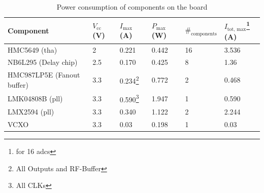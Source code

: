 \begin{table}[tbh]
	\caption{Power consumption of components on the board}
	\label{tab:----theresacomp}
	\begin{minipage}{\textwidth}
		\centering
		\begin{tabularx}{\textwidth}{Xlllll}
			\toprule
			\textbf{Component}         & $V_\text{cc}$ (V) & $I_\text{max}$ (A)                        & $P_\text{max}$ (W) & $\#_\text{components}$ & $I_\text{tot, max}$\footnote{for 16 \glspl{adc}} (A) \\ \midrule
			HMC5649 (\gls{tha})        & 2                 & 0.221                                     & 0.442              & 16                & 3.536                                                \\
			NB6L295 (Delay chip)       & 2.5               & 0.170                                     & 0.425              & 8                 & 1.36                                                 \\
			HMC987LP5E (Fanout buffer) & 3.3               & 0.234\footnote{All Outputs and RF-Buffer} & 0.772              & 2                 & 0.468                                                \\
			LMK04808B (\gls{pll})      & 3.3               & 0.590\footnote{All CLKs}                  & 1.947              & 1                 & 0.590                                                \\
			LMX2594 (\gls{pll})        & 3.3               & 0.340                                     & 1.122              & 2                 & 2.244                                                \\
			VCXO                       & 3.3               & 0.03                                      & 0.198              & 1                 & 0.03                                                 \\ \bottomrule
		\end{tabularx}
	\end{minipage}
\end{table}

